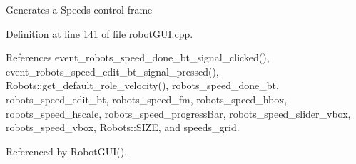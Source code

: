 Generates a Speeds control frame 

Definition at line 141 of file robot\+G\+U\+I.\+cpp.



References event\+\_\+robots\+\_\+speed\+\_\+done\+\_\+bt\+\_\+signal\+\_\+clicked(), event\+\_\+robots\+\_\+speed\+\_\+edit\+\_\+bt\+\_\+signal\+\_\+pressed(), Robots\+::get\+\_\+default\+\_\+role\+\_\+velocity(), robots\+\_\+speed\+\_\+done\+\_\+bt, robots\+\_\+speed\+\_\+edit\+\_\+bt, robots\+\_\+speed\+\_\+fm, robots\+\_\+speed\+\_\+hbox, robots\+\_\+speed\+\_\+hscale, robots\+\_\+speed\+\_\+progress\+Bar, robots\+\_\+speed\+\_\+slider\+\_\+vbox, robots\+\_\+speed\+\_\+vbox, Robots\+::\+S\+I\+ZE, and speeds\+\_\+grid.



Referenced by Robot\+G\+U\+I().


